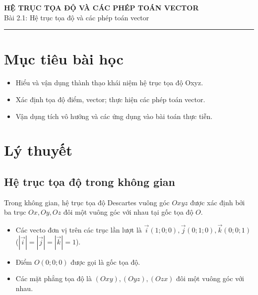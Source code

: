 \documentclass[12pt]{article}
\begin{document}
	
	\begin{center}
		{\Large\bfseries{HỆ TRỤC TỌA ĐỘ VÀ CÁC PHÉP TOÁN VECTOR}}\\[4pt]
		{\large Bài 2.1: Hệ trục tọa độ và các phép toán vector}
	\end{center}
	\vspace{4mm}
	\hrule
	\vspace{4mm}
	
	\section*{Mục tiêu bài học}
	\begin{itemize}
		\item Hiểu và vận dụng thành thạo khái niệm hệ trục tọa độ Oxyz.
		\item Xác định tọa độ điểm, vector; thực hiện các phép toán vector.
		\item Vận dụng tích vô hướng và các ứng dụng vào bài toán thực tiễn.
	\end{itemize}
	
	\setcounter{tocdepth}{2}
	\tableofcontents
	\newpage
	
	\section{Lý thuyết}

	\subsection{Hệ trục tọa độ trong không gian}
	
	Trong không gian, hệ trục tọa độ Descartes vuông góc $Oxyz$ được xác định bởi ba trục $Ox, Oy, Oz$ đôi một vuông góc với nhau tại gốc tọa độ $O$.
	\begin{itemize}
		\item Các vecto đơn vị trên các trục lần lượt là $\vec{i} (1;0;0), \vec{j} (0;1;0), \vec{k} (0;0;1)$ ($|\vec{i}|=|\vec{j}|=|\vec{k}|=1$).
		\item Điểm $O(0;0;0)$ được gọi là gốc tọa độ.
		\item Các mặt phẳng tọa độ là $(Oxy), (Oyz), (Ozx)$ đôi một vuông góc với nhau.
	\end{itemize}
	
\end{document}
